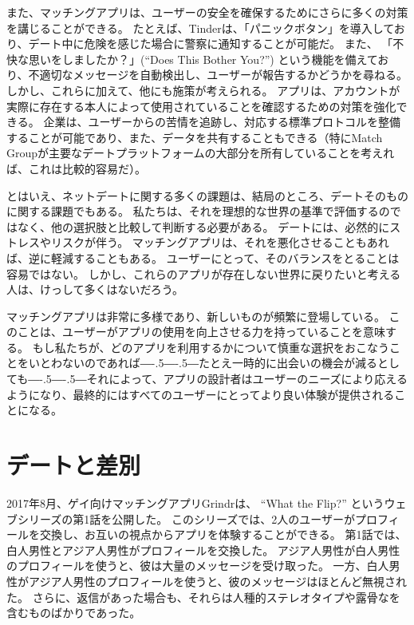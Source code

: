\documentclass[paper=a4,book,openany]{jlreq}
\def\DDASH{―\kern-.5\zw―\kern-.5\zw―} %
\begin{document}
また、マッチングアプリは、ユーザーの安全を確保するためにさらに多くの対策を講じることができる。
たとえば、Tinderは、「パニックボタン」を導入しており、デート中に危険を感じた場合に警察に通知することが可能だ。
また、 「不快な思いをしましたか？」(``Does This Bother You?'') という機能を備えており、不適切なメッセージを自動検出し、ユーザーが報告するかどうかを尋ねる。
しかし、これらに加えて、他にも施策が考えられる。
アプリは、アカウントが実際に存在する本人によって使用されていることを確認するための対策を強化できる。
企業は、ユーザーからの苦情を追跡し、対応する標準プロトコルを整備することが可能であり、また、データを共有することもできる（特にMatch Groupが主要なデートプラットフォームの大部分を所有していることを考えれば、これは比較的容易だ）。

とはいえ、ネットデートに関する多くの課題は、結局のところ、デートそのものに関する課題でもある。
私たちは、それを理想的な世界の基準で評価するのではなく、他の選択肢と比較して判断する必要がある。
デートには、必然的にストレスやリスクが伴う。
マッチングアプリは、それを悪化させることもあれば、逆に軽減することもある。
ユーザーにとって、そのバランスをとることは容易ではない。
しかし、これらのアプリが存在しない世界に戻りたいと考える人は、けっして多くはないだろう。

マッチングアプリは非常に多様であり、新しいものが頻繁に登場している。
このことは、ユーザーがアプリの使用を向上させる力を持っていることを意味する。
もし私たちが、どのアプリを利用するかについて慎重な選択をおこなうことをいとわないのであれば{\DDASH}たとえ一時的に出会いの機会が減るとしても{\DDASH}それによって、アプリの設計者はユーザーのニーズにより応えるようになり、最終的にはすべてのユーザーにとってより良い体験が提供されることになる。

\section{デートと差別}

2017年8月、ゲイ向けマッチングアプリ{Grindr}は、 ``What the Flip?'' というウェブシリーズの第1話を公開した。
このシリーズでは、2人のユーザーがプロフィールを交換し、お互いの視点からアプリを体験することができる。
第1話では、白人男性とアジア人男性がプロフィールを交換した。
アジア人男性が白人男性のプロフィールを使うと、彼は大量のメッセージを受け取った。
一方、白人男性がアジア人男性のプロフィールを使うと、彼のメッセージはほとんど無視された。
さらに、返信があった場合も、それらは人種的ステレオタイプや露骨なを含むものばかりであった\citep{wong17:_watch_what_happen_when_these}。
\end{document}
